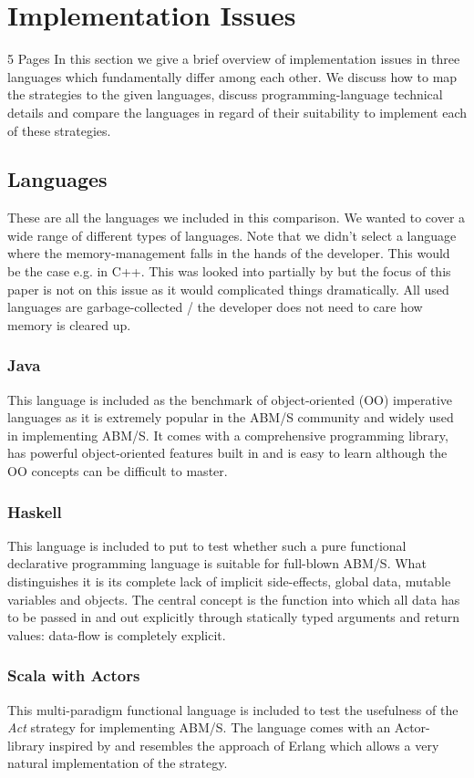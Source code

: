 \section{Implementation Issues}
5 Pages
In this section we give a brief overview of implementation issues in three languages which fundamentally differ among each other. We discuss how to map the strategies to the given languages, discuss programming-language technical details and compare the languages in regard of their suitability to implement each of these strategies. 

\subsection{Languages}
These are all the languages we included in this comparison. We wanted to cover a wide range of different types of languages. Note that we didn't select a language where the memory-management falls in the hands of the developer. This would be the case e.g. in C++. This was looked into partially by \cite{dawson_opening_2014} but the focus of this paper is not on this issue as it would complicated things dramatically. All used languages are garbage-collected / the developer does not need to care how memory is cleared up.

\subsubsection{Java}
This language is included as the benchmark of object-oriented (OO) imperative languages as it is extremely popular in the ABM/S community and widely used in implementing ABM/S. It comes with a comprehensive programming library, has powerful object-oriented features built in and is easy to learn although the OO concepts can be difficult to master.
	
\subsubsection{Haskell}
This language is included to put to test whether such a pure functional declarative programming language is suitable for full-blown ABM/S. What distinguishes it is its complete lack of implicit side-effects, global data, mutable variables and objects. The central concept is the function into which all data has to be passed in and out explicitly through statically typed arguments and return values: data-flow is completely explicit.

\subsubsection{Scala with Actors}
This multi-paradigm functional language is included to test the usefulness of the \textit{Act} strategy for implementing ABM/S. The language comes with an Actor-library inspired by \cite{agha_actors:_1986} and resembles the approach of Erlang which allows a very natural implementation of the strategy.





